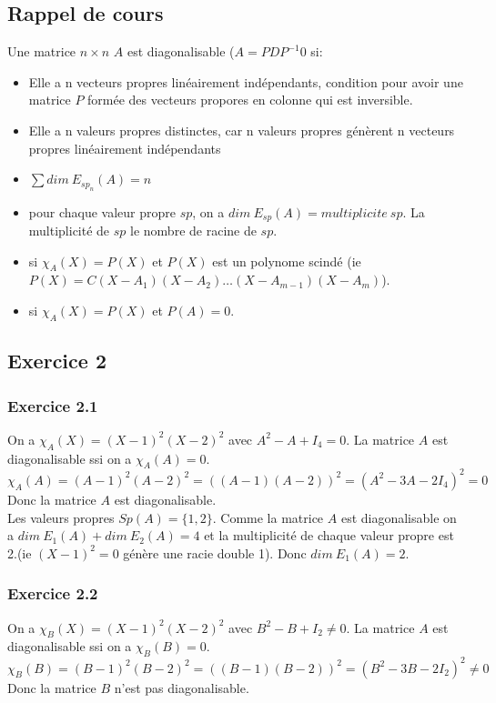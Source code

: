 \documentclass[]{book}
\theoremstyle{definition}
\begin{document}
\subsection*{Rappel de cours}
Une matrice $n \times n$ $A$ est diagonalisable ($A = PDP^{-1}$0 si:
\begin{itemize}
\item Elle a n vecteurs propres lin\'eairement ind\'ependants, condition pour avoir une matrice $P$ form\'ee des vecteurs propores en colonne qui est inversible. 
\item Elle a n valeurs propres distinctes, car n valeurs propres g\'en\`erent n vecteurs propres lin\'eairement ind\'ependants
\item $\sum{dim\ E_{sp_n}(A)} = n$
\item pour chaque valeur propre $sp$, on a $dim\ E_{sp}(A) = multiplicite\ sp$. La multiplicit\'e de $sp$ le nombre de racine de $sp$.
\item si $\chi_{A}(X) = P(X)$ et $P(X)$ est un polynome scind\'e (ie $P(X) = C(X-A_1)(X-A_2)\ldots(X-A_{m-1})(X-A_m)$).
\item si $\chi_{A}(X) = P(X)$ et $P(A)=0$.
\end{itemize}


\newpage
\subsection*{Exercice 2}
\subsubsection*{Exercice 2.1}
On a $\chi_{A}(X) = (X-1)^2(X-2)^2$ avec $A^2-A+I_4 = 0$. La matrice $A$ est diagonalisable ssi on a $\chi_{A}(A) = 0$.
$$\chi_{A}(A) = (A-1)^2(A-2)^2 = ((A-1)(A-2))^2=(A^2-3A-2I_4)^2 = 0$$
Donc la matrice $A$ est diagonalisable.\\
Les valeurs propres $Sp(A)=\{1,2\}$. Comme la matrice $A$ est diagonalisable on a $dim\ E_1(A) + dim\ E_2(A) = 4$ et la multiplicit\'e de chaque valeur propre est 2.(ie $(X-1)^2 = 0$ g\'en\`ere une racie double 1). Donc $dim\ E_1(A)=2$.


\subsubsection*{Exercice 2.2}
On a $\chi_{B}(X) = (X-1)^2(X-2)^2$ avec $B^2-B+I_2 \neq 0$. La matrice $A$ est diagonalisable ssi on a $\chi_{B}(B) = 0$.
$$\chi_{B}(B) = (B-1)^2(B-2)^2 = ((B-1)(B-2))^2=(B^2-3B-2I_2)^2 \neq 0$$
Donc la matrice $B$ n'est pas diagonalisable.\\
\end{document}
